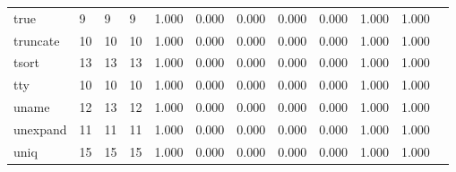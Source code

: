 \begin{longtable}{lp{1.00cm}p{1.00cm}p{1.00cm}p{1.00cm}p{1.00cm}p{1.00cm}p{1.00cm}p{1.00cm}p{1.00cm}p{1.00cm}p{1.00cm}}
true      &                            9 &                  9 &                                 9 &                                      1.000 &                                  0.000 &                                        0.000 &                             0.000 &                                   0.000 &                        1.000 &                                        1.000 \\
truncate  &                           10 &                 10 &                                10 &                                      1.000 &                                  0.000 &                                        0.000 &                             0.000 &                                   0.000 &                        1.000 &                                        1.000 \\
tsort     &                           13 &                 13 &                                13 &                                      1.000 &                                  0.000 &                                        0.000 &                             0.000 &                                   0.000 &                        1.000 &                                        1.000 \\
tty       &                           10 &                 10 &                                10 &                                      1.000 &                                  0.000 &                                        0.000 &                             0.000 &                                   0.000 &                        1.000 &                                        1.000 \\
uname     &                           12 &                 13 &                                12 &                                      1.000 &                                  0.000 &                                        0.000 &                             0.000 &                                   0.000 &                        1.000 &                                        1.000 \\
unexpand  &                           11 &                 11 &                                11 &                                      1.000 &                                  0.000 &                                        0.000 &                             0.000 &                                   0.000 &                        1.000 &                                        1.000 \\
uniq      &                           15 &                 15 &                                15 &                                      1.000 &                                  0.000 &                                        0.000 &                             0.000 &                                   0.000 &                        1.000 &                                        1.000 \\

\end{longtable}
